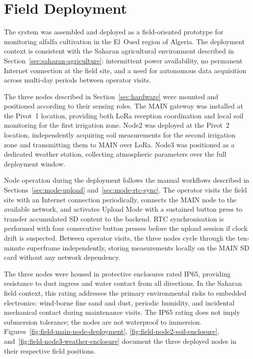 \section{Field Deployment}
\label{sec:deployment}

The system was assembled and deployed as a field-oriented prototype for monitoring alfalfa cultivation in the El~Oued region of Algeria. The deployment context is consistent with the Saharan agricultural environment described in Section~\ref{sec:saharan-agriculture}: intermittent power availability, no permanent Internet connection at the field site, and a need for autonomous data acquisition across multi-day periods between operator visits.

The three nodes described in Section~\ref{sec:hardware} were mounted and positioned according to their sensing roles. The MAIN gateway was installed at the Pivot~1 location, providing both LoRa reception coordination and local soil monitoring for the first irrigation zone. Node2 was deployed at the Pivot~2 location, independently acquiring soil measurements for the second irrigation zone and transmitting them to MAIN over LoRa. Node3 was positioned as a dedicated weather station, collecting atmospheric parameters over the full deployment window.

Node operation during the deployment follows the manual workflows described in Sections~\ref{sec:mode-upload} and~\ref{sec:mode-rtc-sync}. The operator visits the field site with an Internet connection periodically, connects the MAIN node to the available network, and activates Upload Mode with a sustained button press to transfer accumulated SD content to the backend. RTC synchronisation is performed with four consecutive button presses before the upload session if clock drift is suspected. Between operator visits, the three nodes cycle through the ten-minute superframe independently, storing measurements locally on the MAIN SD card without any network dependency.

The three nodes were housed in protective enclosures rated IP65, providing resistance to dust ingress and water contact from all directions. In the Saharan field context, this rating addresses the primary environmental risks to embedded electronics: wind-borne fine sand and dust, periodic humidity, and incidental mechanical contact during maintenance visits. The IP65 rating does not imply submersion tolerance; the nodes are not waterproof to immersion. Figures~\ref{fig:field-main-node-deployment}, \ref{fig:field-node2-soil-enclosure}, and~\ref{fig:field-node3-weather-enclosure} document the three deployed nodes in their respective field positions.

